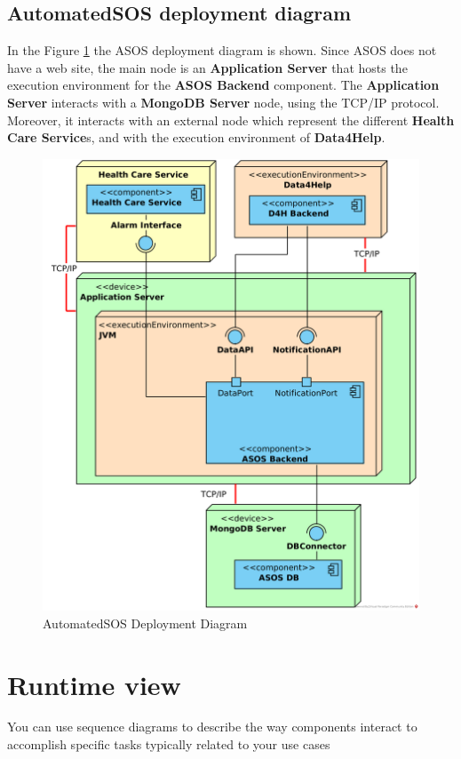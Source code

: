 \documentclass[a4paper, hidelinks, 12pt]{report}
\begin{document}
	\subsection{AutomatedSOS deployment diagram}
	In the Figure \ref{fig:asos_deployment_diagram} the ASOS deployment diagram is shown. Since ASOS does not have a web site, the main node is an \textbf{Application Server} that hosts the execution environment for the \textbf{ASOS Backend} component. The \textbf{Application Server} interacts with a \textbf{MongoDB Server} node, using the TCP/IP protocol. Moreover, it interacts with an external node which represent the different \textbf{Health Care Service}s, and with the execution environment of \textbf{Data4Help}.
		\begin{figure}[H]
			\centering
			\includegraphics[width=1\textwidth]{diagrams/asos_deployment_diagram.png}
			\caption[AutomatedSOS Deployment Diagram]{AutomatedSOS Deployment Diagram}
			\label{fig:asos_deployment_diagram}
		\end{figure}	
	
	\section{Runtime view}
	You can use sequence diagrams to describe the way components
interact to accomplish specific tasks typically related to your use cases
\end{document}
